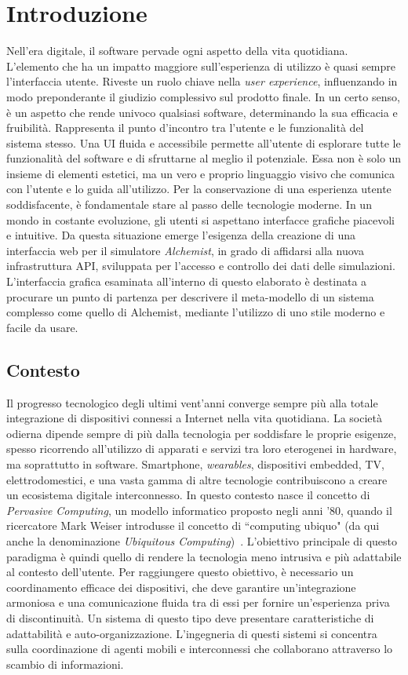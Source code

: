 \chapter{Introduzione}\label{chap:introduction}
Nell'era digitale, il software pervade ogni aspetto della vita quotidiana. L'elemento che ha un impatto maggiore sull'esperienza di utilizzo è quasi sempre l'interfaccia utente. Riveste un ruolo chiave nella \textit{user experience},  influenzando in modo preponderante il giudizio complessivo sul prodotto finale. In un certo senso, è un aspetto che rende univoco qualsiasi software, determinando la sua efficacia e fruibilità. Rappresenta il punto d'incontro tra l'utente e le funzionalità del sistema stesso. Una \ac{UI} fluida e accessibile permette all'utente di esplorare tutte le funzionalità del software e di sfruttarne al meglio il potenziale. Essa non è solo un insieme di elementi estetici, ma un vero e proprio linguaggio visivo che comunica con l'utente e lo guida all'utilizzo.
\newline 
Per la conservazione di una esperienza utente soddisfacente, è fondamentale stare al passo delle tecnologie moderne. In un mondo in costante evoluzione, gli utenti si aspettano interfacce grafiche piacevoli e intuitive.
Da questa situazione emerge l'esigenza della creazione di una interfaccia web per il simulatore \textit{Alchemist}, in grado di affidarsi alla nuova infrastruttura \ac{API}, sviluppata per l'accesso e controllo dei dati delle simulazioni. L'interfaccia grafica esaminata all'interno di questo elaborato è destinata a procurare un punto di partenza per descrivere il meta-modello di un sistema complesso come quello di Alchemist, mediante l'utilizzo di uno stile moderno e facile da usare.
\section{Contesto}
Il progresso tecnologico degli ultimi vent'anni converge sempre più alla totale integrazione di dispositivi connessi a Internet nella vita quotidiana. La società odierna dipende sempre di più dalla tecnologia per soddisfare le proprie esigenze, spesso ricorrendo all'utilizzo di apparati e servizi tra loro eterogenei in hardware, ma soprattutto in software. Smartphone, \textit{wearables}, dispositivi embedded, TV, elettrodomestici, e una vasta gamma di altre tecnologie contribuiscono a creare un ecosistema digitale interconnesso. In questo contesto nasce il concetto di \textit{Pervasive Computing}, un modello informatico proposto negli anni '80, quando il ricercatore Mark Weiser introdusse il concetto di ``computing ubiquo" (da qui anche la denominazione \textit{Ubiquitous Computing})~\cite{Weiser2002}.
L'obiettivo principale di questo paradigma è quindi quello di rendere la tecnologia meno intrusiva e più adattabile al contesto dell'utente.   Per raggiungere questo obiettivo, è necessario un coordinamento efficace dei dispositivi, che deve garantire un'integrazione armoniosa e una comunicazione fluida tra di essi per fornire un'esperienza priva di discontinuità. Un sistema di questo tipo deve presentare caratteristiche di adattabilità e auto-organizzazione.
L'ingegneria di questi sistemi si concentra sulla coordinazione di agenti mobili e interconnessi che collaborano attraverso lo scambio di informazioni.
